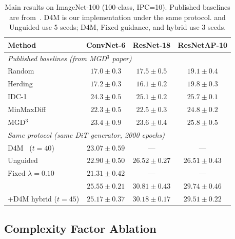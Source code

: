 \begin{table}[t]
\centering
\footnotesize
\caption{Main results on ImageNet-100 (100-class, IPC=10). Published baselines are from~\cite{chansantiago2025modeguided}. D4M is our implementation under the same protocol. \cags{} and Unguided use 5 seeds; D4M, Fixed guidance, and hybrid use 3 seeds.}
\label{tab:sota-main}
\begin{tabular}{lccc}
\toprule
\textbf{Method} & \textbf{ConvNet-6} & \textbf{ResNet-18} & \textbf{ResNetAP-10} \\
\midrule
\multicolumn{4}{l}{\emph{Published baselines (from MGD$^3$ paper)}} \\
Random & $17.0 \pm 0.3$ & $17.5 \pm 0.5$ & $19.1 \pm 0.4$ \\
Herding & $17.2 \pm 0.3$ & $16.1 \pm 0.2$ & $19.8 \pm 0.3$ \\
IDC-1~\cite{kim2022dataset} & $24.3 \pm 0.5$ & $25.1 \pm 0.2$ & $25.7 \pm 0.1$ \\
MinMaxDiff~\cite{fan2025generative} & $22.3 \pm 0.5$ & $22.5 \pm 0.3$ & $24.8 \pm 0.2$ \\
MGD$^3$~\cite{chansantiago2025modeguided} & $23.4 \pm 0.9$ & $23.6 \pm 0.4$ & $25.8 \pm 0.5$ \\
\midrule
\multicolumn{4}{l}{\emph{Same protocol (same DiT generator, 2000 epochs)}} \\
D4M~\cite{su2024dataset} ($t{=}40$) & $23.07 \pm 0.59$ & --- & --- \\
Unguided & $22.90 \pm 0.50$ & $26.52 \pm 0.27$ & $26.51 \pm 0.43$ \\
Fixed $\lambda = 0.10$ & $21.31 \pm 0.42$ & --- & --- \\
\cags{} & $\mathbf{25.55 \pm 0.21}$ & $\mathbf{30.81 \pm 0.43}$ & $\mathbf{29.74 \pm 0.46}$ \\
\cags{}+D4M hybrid ($t{=}45$) & $25.17 \pm 0.37$ & $30.18 \pm 0.17$ & $29.51 \pm 0.22$ \\
\bottomrule
\end{tabular}
\end{table}

\subsection{Complexity Factor Ablation}
\label{sec:factor-ablation}

